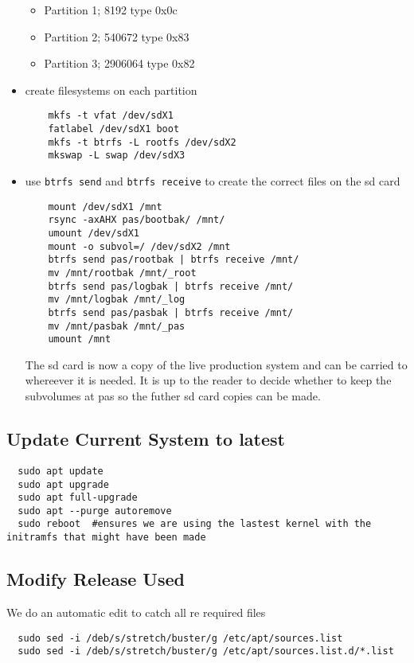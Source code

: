 \documentclass[Draft]{akc}
\begin{document}
\begin{itemize}
  \begin{itemize}
    \item Partition 1; 8192 type 0x0c
    \item Partition 2; 540672 type 0x83
    \item Partition 3; 2906064 type 0x82
  \end{itemize}
  \item create filesystems on each partition
  \begin{lstlisting}
    mkfs -t vfat /dev/sdX1
    fatlabel /dev/sdX1 boot
    mkfs -t btrfs -L rootfs /dev/sdX2
    mkswap -L swap /dev/sdX3
  \end{lstlisting}
  \item use \texttt{btrfs send} and \texttt{btrfs receive} to create the correct files on the sd card
  \begin{lstlisting}
    mount /dev/sdX1 /mnt
    rsync -axAHX pas/bootbak/ /mnt/
    umount /dev/sdX1
    mount -o subvol=/ /dev/sdX2 /mnt
    btrfs send pas/rootbak | btrfs receive /mnt/
    mv /mnt/rootbak /mnt/_root
    btrfs send pas/logbak | btrfs receive /mnt/
    mv /mnt/logbak /mnt/_log
    btrfs send pas/pasbak | btrfs receive /mnt/
    mv /mnt/pasbak /mnt/_pas
    umount /mnt
  \end{lstlisting}
  The sd card is now a copy of the live production system and can be carried to whereever it is needed.  It is up to the
  reader to decide whether to keep the subvolumes at pas so the futher sd card copies can be made.
\end{itemize}

\subsection{Update Current System to latest}

\begin{lstlisting}
  sudo apt update
  sudo apt upgrade
  sudo apt full-upgrade
  sudo apt --purge autoremove
  sudo reboot  #ensures we are using the lastest kernel with the initramfs that might have been made
\end{lstlisting}
\subsection{Modify Release Used}
We do an automatic edit to catch all re required files
\begin{lstlisting}
  sudo sed -i /deb/s/stretch/buster/g /etc/apt/sources.list
  sudo sed -i /deb/s/stretch/buster/g /etc/apt/sources.list.d/*.list
\end{lstlisting}
\end{document}
